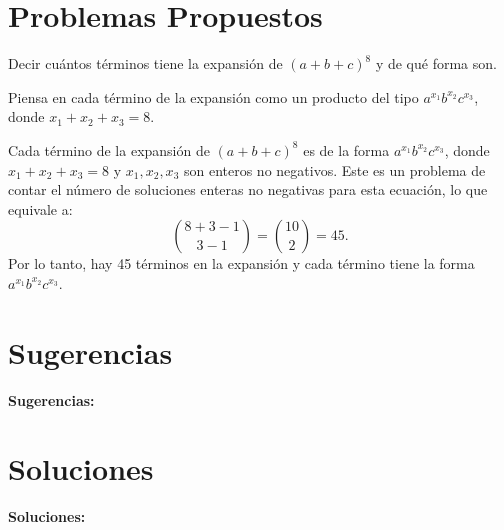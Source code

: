 \documentclass{article}
\begin{document}

\section{Problemas Propuestos}

Decir cuántos términos tiene la expansión de $(a+b+c)^8$ y de qué forma son.
\begin{hint}
Piensa en cada término de la expansión como un producto del tipo $a^{x_1} b^{x_2} c^{x_3}$, donde $x_1 + x_2 + x_3 = 8$.
\end{hint}
\begin{solu}
Cada término de la expansión de $(a+b+c)^8$ es de la forma $a^{x_1} b^{x_2} c^{x_3}$, donde $x_1 + x_2 + x_3 = 8$ y $x_1, x_2, x_3$ son enteros no negativos. Este es un problema de contar el número de soluciones enteras no negativas para esta ecuación, lo que equivale a:
\[
\binom{8+3-1}{3-1} = \binom{10}{2} = 45.
\]
Por lo tanto, hay 45 términos en la expansión y cada término tiene la forma $a^{x_1} b^{x_2} c^{x_3}$.
\end{solu}


\section{Sugerencias}

\textbf{Sugerencias:}
\begin{enumerate}

\end{enumerate}

\section{Soluciones}

\textbf{Soluciones:}
\begin{enumerate}

\end{enumerate}
\end{document}
